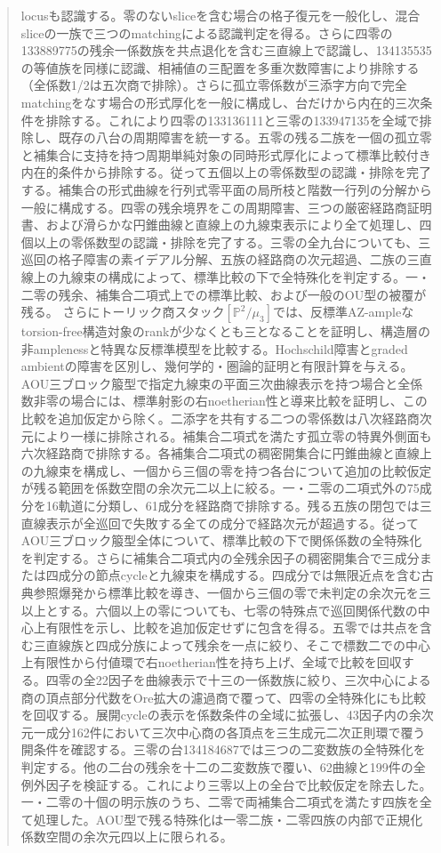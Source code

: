 \documentclass[11pt,a4paper]{ltjsarticle}
\theoremstyle{definition}
\begin{document}
\begin{abstract}
locusも認識する。零のないsliceを含む場合の格子復元を一般化し、混合sliceの一族で三つのmatchingによる認識判定を得る。さらに四零の133889775の残余一係数族を共点退化を含む三直線上で認識し、134135535の等値族を同様に認識、相補値の三配置を多重次数障害により排除する（全係数1/2は五次商で排除）。さらに孤立零係数が三添字方向で完全matchingをなす場合の形式厚化を一般に構成し、台だけから内在的三次条件を排除する。これにより四零の133136111と三零の133947135を全域で排除し、既存の八台の周期障害を統一する。五零の残る二族を一個の孤立零と補集合に支持を持つ周期単純対象の同時形式厚化によって標準比較付き内在的条件から排除する。従って五個以上の零係数型の認識・排除を完了する。補集合の形式曲線を行列式零平面の局所枝と階数一行列の分解から一般に構成する。四零の残余境界をこの周期障害、三つの厳密経路商証明書、および滑らかな円錐曲線と直線上の九線束表示により全て処理し、四個以上の零係数型の認識・排除を完了する。三零の全九台についても、三巡回の格子障害の素イデアル分解、五族の経路商の次元超過、二族の三直線上の九線束の構成によって、標準比較の下で全特殊化を判定する。一・二零の残余、補集合二項式上での標準比較、および一般のOU型の被覆が残る。
さらにトーリック商スタック$[\mathbb P^2/\mu_3]$では、反標準AZ-ampleなtorsion-free構造対象のrankが少なくとも三となることを証明し、構造層の非amplenessと特異な反標準模型を比較する。Hochschild障害とgraded ambientの障害を区別し、幾何学的・圏論的証明と有限計算を与える。
AOU三ブロック箙型で指定九線束の平面三次曲線表示を持つ場合と全係数非零の場合には、標準射影の右noetherian性と導来比較を証明し、この比較を追加仮定から除く。二添字を共有する二つの零係数は八次経路商次元により一様に排除される。補集合二項式を満たす孤立零の特異外側面も六次経路商で排除する。各補集合二項式の稠密開集合に円錐曲線と直線上の九線束を構成し、一個から三個の零を持つ各台について追加の比較仮定が残る範囲を係数空間の余次元二以上に絞る。一・二零の二項式外の75成分を16軌道に分類し、61成分を経路商で排除する。残る五族の閉包では三直線表示が全巡回で失敗する全ての成分で経路次元が超過する。従ってAOU三ブロック箙型全体について、標準比較の下で関係係数の全特殊化を判定する。さらに補集合二項式内の全残余因子の稠密開集合で三成分または四成分の節点cycleと九線束を構成する。四成分では無限近点を含む古典参照爆発から標準比較を導き、一個から三個の零で未判定の余次元を三以上とする。六個以上の零についても、七零の特殊点で巡回関係代数の中心上有限性を示し、比較を追加仮定せずに包含を得る。五零では共点を含む三直線族と四成分族によって残余を一点に絞り、そこで標数二での中心上有限性から付値環で右noetherian性を持ち上げ、全域で比較を回収する。四零の全22因子を曲線表示で十三の一係数族に絞り、三次中心による商の頂点部分代数をOre拡大の濾過商で覆って、四零の全特殊化にも比較を回収する。展開cycleの表示を係数条件の全域に拡張し、43因子内の余次元一成分162件において三次中心商の各頂点を三生成元二次正則環で覆う開条件を確認する。三零の台134184687では三つの二変数族の全特殊化を判定する。他の二台の残余を十二の二変数族で覆い、62曲線と199件の全例外因子を検証する。これにより三零以上の全台で比較仮定を除去した。一・二零の十個の明示族のうち、二零で両補集合二項式を満たす四族を全て処理した。AOU型で残る特殊化は一零二族・二零四族の内部で正規化係数空間の余次元四以上に限られる。

\end{abstract}
\end{document}
